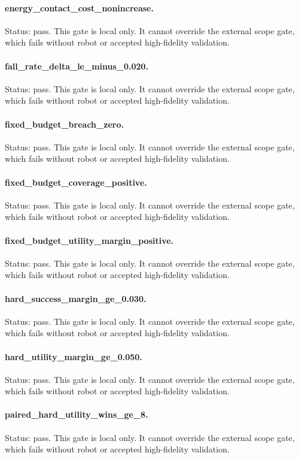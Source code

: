 \documentclass{article}
\begin{document}
\paragraph{energy\_contact\_cost\_nonincrease.} Status: pass. This gate is local only. It cannot override the external scope gate, which fails without robot or accepted high-fidelity validation.
\paragraph{fall\_rate\_delta\_le\_minus\_0.020.} Status: pass. This gate is local only. It cannot override the external scope gate, which fails without robot or accepted high-fidelity validation.
\paragraph{fixed\_budget\_breach\_zero.} Status: pass. This gate is local only. It cannot override the external scope gate, which fails without robot or accepted high-fidelity validation.
\paragraph{fixed\_budget\_coverage\_positive.} Status: pass. This gate is local only. It cannot override the external scope gate, which fails without robot or accepted high-fidelity validation.
\paragraph{fixed\_budget\_utility\_margin\_positive.} Status: pass. This gate is local only. It cannot override the external scope gate, which fails without robot or accepted high-fidelity validation.
\paragraph{hard\_success\_margin\_ge\_0.030.} Status: pass. This gate is local only. It cannot override the external scope gate, which fails without robot or accepted high-fidelity validation.
\paragraph{hard\_utility\_margin\_ge\_0.050.} Status: pass. This gate is local only. It cannot override the external scope gate, which fails without robot or accepted high-fidelity validation.
\paragraph{paired\_hard\_utility\_wins\_ge\_8.} Status: pass. This gate is local only. It cannot override the external scope gate, which fails without robot or accepted high-fidelity validation.
\end{document}
